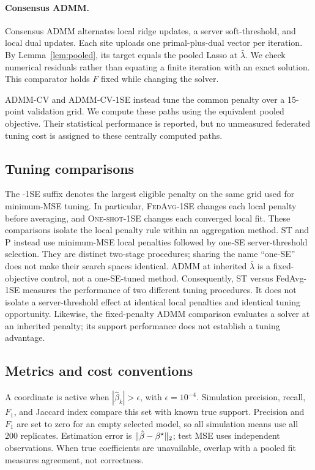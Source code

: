 \paragraph{Consensus ADMM.}
Consensus ADMM \citep{boyd2011} alternates local ridge updates,
a server soft-threshold, and local dual updates.
Each site uploads one primal-plus-dual vector per iteration. By
Lemma~\ref{lem:pooled}, its target equals the pooled Lasso at
$\bar\lambda$. We check numerical residuals rather than equating a finite
iteration with an exact solution. This comparator holds $F$ fixed while
changing the solver.

\textsc{ADMM-CV} and \textsc{ADMM-CV-1SE} instead tune the common penalty
over a 15-point validation grid. We compute these paths using the equivalent
pooled objective. Their statistical performance is reported, but no
unmeasured federated tuning cost is assigned to these centrally computed paths.

\subsection{Tuning comparisons}
\label{sub:matched}

The -1SE suffix denotes the largest eligible penalty on the same grid used
for minimum-MSE tuning. In particular, \textsc{FedAvg-1SE} changes each
local penalty before averaging, and \textsc{One-shot-1SE} changes each
converged local fit. These comparisons isolate the local penalty rule
within an aggregation method. ST and P instead use minimum-MSE local
penalties followed by one-SE server-threshold selection. They are distinct
two-stage procedures; sharing the name ``one-SE'' does not make their
search spaces identical. ADMM at inherited $\bar\lambda$ is a fixed-objective
control, not a one-SE-tuned method.
Consequently, ST versus FedAvg-1SE measures the performance of two
different tuning procedures. It does not isolate a server-threshold effect
at identical local penalties and identical tuning opportunity. Likewise,
the fixed-penalty ADMM comparison evaluates a solver at an inherited
penalty; its support performance does not establish a tuning advantage.

\subsection{Metrics and cost conventions}

A coordinate is active when $|\hat\beta_k|>\epsilon$, with
$\epsilon=10^{-4}$. Simulation precision, recall, $F_1$, and Jaccard index
compare this set with known true support. Precision and $F_1$ are set to
zero for an empty selected model, so all simulation means use all 200
replicates. Estimation error is $\|\hat{\beta}-\beta^\star\|_2$; test MSE
uses independent observations. When true coefficients are unavailable,
overlap with a pooled fit measures agreement, not correctness.

